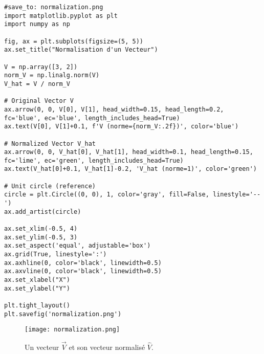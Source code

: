 \documentclass{article}
\begin{document}
\begin{verbatim}
#save_to: normalization.png
import matplotlib.pyplot as plt
import numpy as np

fig, ax = plt.subplots(figsize=(5, 5))
ax.set_title("Normalisation d'un Vecteur")

V = np.array([3, 2])
norm_V = np.linalg.norm(V)
V_hat = V / norm_V

# Original Vector V
ax.arrow(0, 0, V[0], V[1], head_width=0.15, head_length=0.2, fc='blue', ec='blue', length_includes_head=True)
ax.text(V[0], V[1]+0.1, f'V (norme={norm_V:.2f})', color='blue')

# Normalized Vector V_hat
ax.arrow(0, 0, V_hat[0], V_hat[1], head_width=0.1, head_length=0.15, fc='lime', ec='green', length_includes_head=True)
ax.text(V_hat[0]+0.1, V_hat[1]-0.2, 'V_hat (norme=1)', color='green')

# Unit circle (reference)
circle = plt.Circle((0, 0), 1, color='gray', fill=False, linestyle='--')
ax.add_artist(circle)

ax.set_xlim(-0.5, 4)
ax.set_ylim(-0.5, 3)
ax.set_aspect('equal', adjustable='box')
ax.grid(True, linestyle=':')
ax.axhline(0, color='black', linewidth=0.5)
ax.axvline(0, color='black', linewidth=0.5)
ax.set_xlabel("X")
ax.set_ylabel("Y")

plt.tight_layout()
plt.savefig('normalization.png')
\end{verbatim}

\begin{figure}[H]
\centering
\texttt{[image: normalization.png]}
\caption{Un vecteur $\vec{V}$ et son vecteur normalisé $\hat{V}$.}
\label{fig:normalization}
\end{figure}
\end{document}
